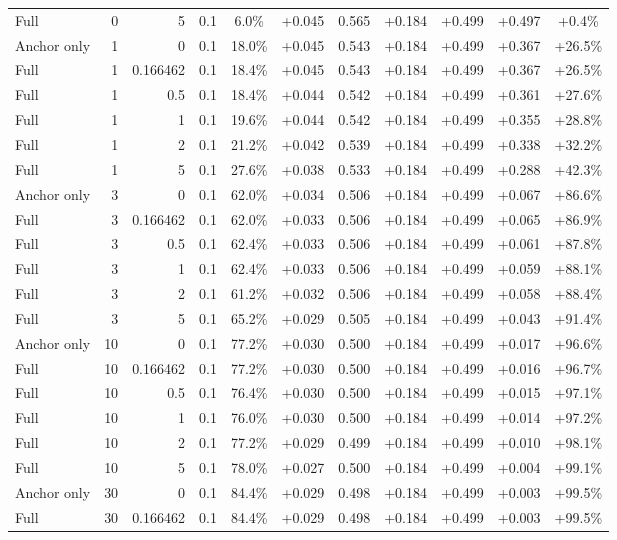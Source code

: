 \begin{table}[htbp]
\begin{tabular}{lrrrccccccc}
Full & 0 & 5 & 0.1 & 6.0\% & +0.045 & 0.565 & +0.184 & +0.499 & +0.497 & +0.4\% \\
Anchor only & 1 & 0 & 0.1 & 18.0\% & +0.045 & 0.543 & +0.184 & +0.499 & +0.367 & +26.5\% \\
Full & 1 & 0.166462 & 0.1 & 18.4\% & +0.045 & 0.543 & +0.184 & +0.499 & +0.367 & +26.5\% \\
Full & 1 & 0.5 & 0.1 & 18.4\% & +0.044 & 0.542 & +0.184 & +0.499 & +0.361 & +27.6\% \\
Full & 1 & 1 & 0.1 & 19.6\% & +0.044 & 0.542 & +0.184 & +0.499 & +0.355 & +28.8\% \\
Full & 1 & 2 & 0.1 & 21.2\% & +0.042 & 0.539 & +0.184 & +0.499 & +0.338 & +32.2\% \\
Full & 1 & 5 & 0.1 & 27.6\% & +0.038 & 0.533 & +0.184 & +0.499 & +0.288 & +42.3\% \\
Anchor only & 3 & 0 & 0.1 & 62.0\% & +0.034 & 0.506 & +0.184 & +0.499 & +0.067 & +86.6\% \\
Full & 3 & 0.166462 & 0.1 & 62.0\% & +0.033 & 0.506 & +0.184 & +0.499 & +0.065 & +86.9\% \\
Full & 3 & 0.5 & 0.1 & 62.4\% & +0.033 & 0.506 & +0.184 & +0.499 & +0.061 & +87.8\% \\
Full & 3 & 1 & 0.1 & 62.4\% & +0.033 & 0.506 & +0.184 & +0.499 & +0.059 & +88.1\% \\
Full & 3 & 2 & 0.1 & 61.2\% & +0.032 & 0.506 & +0.184 & +0.499 & +0.058 & +88.4\% \\
Full & 3 & 5 & 0.1 & 65.2\% & +0.029 & 0.505 & +0.184 & +0.499 & +0.043 & +91.4\% \\
Anchor only & 10 & 0 & 0.1 & 77.2\% & +0.030 & 0.500 & +0.184 & +0.499 & +0.017 & +96.6\% \\
Full & 10 & 0.166462 & 0.1 & 77.2\% & +0.030 & 0.500 & +0.184 & +0.499 & +0.016 & +96.7\% \\
Full & 10 & 0.5 & 0.1 & 76.4\% & +0.030 & 0.500 & +0.184 & +0.499 & +0.015 & +97.1\% \\
Full & 10 & 1 & 0.1 & 76.0\% & +0.030 & 0.500 & +0.184 & +0.499 & +0.014 & +97.2\% \\
Full & 10 & 2 & 0.1 & 77.2\% & +0.029 & 0.499 & +0.184 & +0.499 & +0.010 & +98.1\% \\
Full & 10 & 5 & 0.1 & 78.0\% & +0.027 & 0.500 & +0.184 & +0.499 & +0.004 & +99.1\% \\
Anchor only & 30 & 0 & 0.1 & 84.4\% & +0.029 & 0.498 & +0.184 & +0.499 & +0.003 & +99.5\% \\
Full & 30 & 0.166462 & 0.1 & 84.4\% & +0.029 & 0.498 & +0.184 & +0.499 & +0.003 & +99.5\% \\

\end{tabular}
\end{table}
